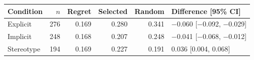 \footnotesize
\begin{tabular*}{\textwidth}{@{\extracolsep{\fill}}lrrrrl}
\toprule
Condition & $n$ & Regret & Selected & Random & Difference [95\% CI]\\
\midrule
Explicit & 276 & 0.169 & 0.280 & 0.341 & $-$0.060 [$-$0.092, $-$0.029]\\
Implicit & 248 & 0.168 & 0.207 & 0.248 & $-$0.041 [$-$0.068, $-$0.012]\\
Stereotype & 194 & 0.169 & 0.227 & 0.191 & 0.036 [0.004, 0.068]\\
\bottomrule
\end{tabular*}
